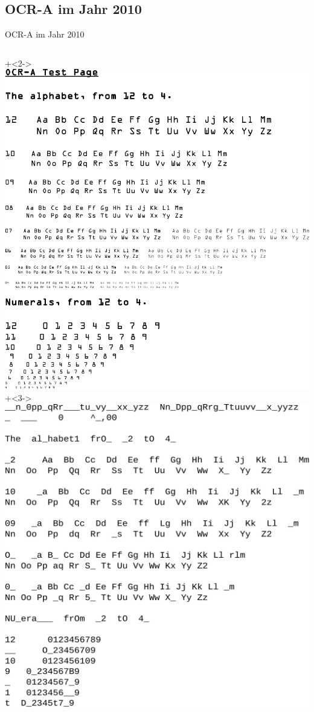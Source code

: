 \subsection{OCR-A im Jahr 2010}
\begin{frame}{OCR-A im Jahr 2010}
	\begin{columns}
		\onslide+<2->\includegraphics[width=\textwidth]{penma/gocr/testdoc.pdf}
		\onslide+<3->\includegraphics[width=\textwidth]{penma/gocr/readout-t.pdf}
	\end{columns}
\end{frame}

